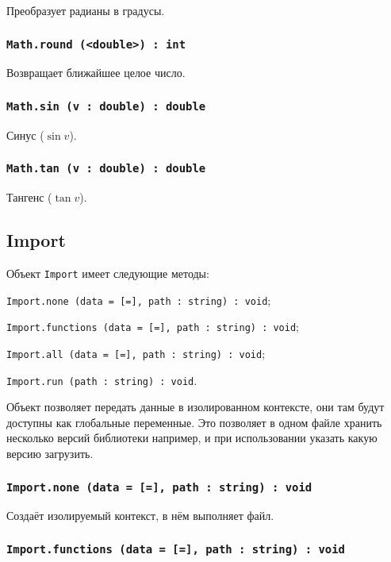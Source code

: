 Преобразует радианы в градусы.

\subsubsection{\lstinline|Math.round (<double>) : int|}

Возвращает ближайшее целое число.

\subsubsection{\lstinline|Math.sin (v : double) : double|}

Синус ($\sin{v}$).

\subsubsection{\lstinline|Math.tan (v : double) : double|}

Тангенс ($\tan{v}$).

\subsection{{\color{orange} Import}}

Объект \lstinline|Import| имеет следующие методы:
\begin{icItems}
	\item \lstinline|Import.none (data = [=], path : string) : void|;
	\item \lstinline|Import.functions (data = [=], path : string) : void|;
	\item \lstinline|Import.all (data = [=], path : string) : void|;
	\item \lstinline|Import.run (path : string) : void|.
\end{icItems}

Объект  позволяет передать данные в изолированном контексте, они там будут доступны как глобальные переменные. Это позволяет в одном файле хранить несколько версий библиотеки например, и при использовании указать какую версию загрузить.

\subsubsection{\lstinline|Import.none (data = [=], path : string) : void|}

Создаёт изолируемый контекст, в нём выполняет файл.

\subsubsection{\lstinline|Import.functions (data = [=], path : string) : void|}

